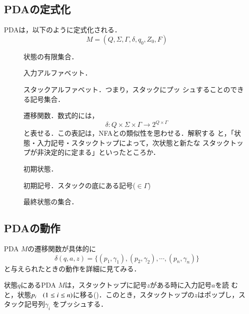 \subsection{PDAの定式化}
PDAは，以下のように定式化される．
\[
 M = (Q, \Sigma, \Gamma, \delta, q_0, Z_0, F)
\]
\begin{description}
 \item[] 状態の有限集合．
 \item[\mystrong{$\Sigma$}] 入力アルファベット．
 \item[\mystrong{$\Gamma$}] スタックアルファベット．つまり，スタックにプッ
            シュすることのできる記号集合．
 \item[\mystrong{$\delta$}] 遷移関数．数式的には，
            \[
             \delta : Q \times \Sigma \times \Gamma \rightarrow 2^{Q
            \times \Gamma}
            \]
            と表せる．この表記は，NFAとの類似性を思わせる．解釈する
            と，「状態・入力記号・スタックトップによって，次状態と新たな
            スタックトップが非決定的に定まる」といったところか．
 \item[] 初期状態．
 \item[] 初期記号．スタックの底にある記号($\in \Gamma$)
 \item[] 最終状態の集合．
\end{description}

\subsection{PDAの動作}
PDA $M$の遷移関数が具体的に
\[
 \delta (q, a, z) = \{(p_1, \gamma_1), (p_2, \gamma_2), \cdots , (p_n, \gamma_n)\}
\]
と与えられたときの動作を詳細に見てみる．

状態$q$にあるPDA $M$は，スタックトップに記号$z$がある時に入力記号$a$を読
むと，状態$p_i \hspace{2ex} (1 \leq i \leq n)$に移る()．このとき，スタックトップの$z$はポップし，スタック記号列$\gamma_i$
をプッシュする．

